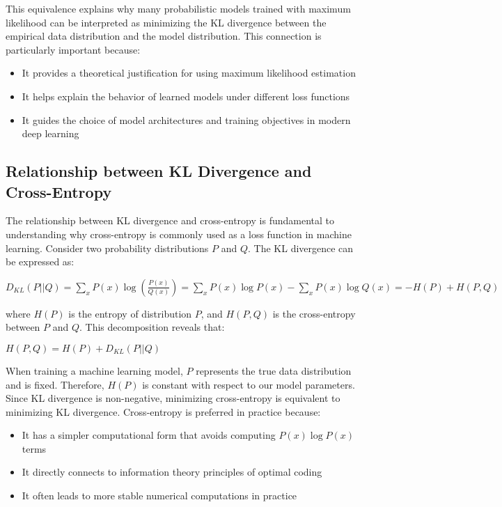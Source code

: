 \documentclass[preprint,12pt]{elsarticle}
\begin{document}
This equivalence explains why many probabilistic models trained with maximum likelihood can be interpreted as minimizing the KL divergence between the empirical data distribution and the model distribution. This connection is particularly important because:

\begin{itemize}
    \item It provides a theoretical justification for using maximum likelihood estimation
    \item It helps explain the behavior of learned models under different loss functions
    \item It guides the choice of model architectures and training objectives in modern deep learning
\end{itemize}
\subsection{Relationship between KL Divergence and Cross-Entropy}
The relationship between KL divergence and cross-entropy is fundamental to understanding why cross-entropy is commonly used as a loss function in machine learning. Consider two probability distributions $P$ and $Q$. The KL divergence can be expressed as:

$
D_{KL}(P||Q) = \sum_{x} P(x) \log \left(\frac{P(x)}{Q(x)}\right)
= \sum_{x} P(x) \log P(x) - \sum_{x} P(x) \log Q(x)
= -H(P) + H(P,Q)
$

where $H(P)$ is the entropy of distribution $P$, and $H(P,Q)$ is the cross-entropy between $P$ and $Q$. This decomposition reveals that:

$
H(P,Q) = H(P) + D_{KL}(P||Q)
$

When training a machine learning model, $P$ represents the true data distribution and is fixed. Therefore, $H(P)$ is constant with respect to our model parameters. Since KL divergence is non-negative, minimizing cross-entropy is equivalent to minimizing KL divergence. Cross-entropy is preferred in practice because:

\begin{itemize}
    \item It has a simpler computational form that avoids computing $P(x)\log P(x)$ terms
    \item It directly connects to information theory principles of optimal coding
    \item It often leads to more stable numerical computations in practice
\end{itemize}
\end{document}
